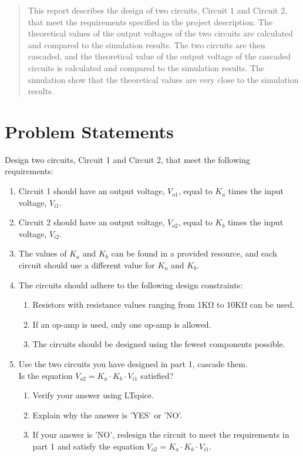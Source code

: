 \documentclass{zc-ust-hw}
\begin{document}
\maketitle
\tableofcontents
\listoffigures
\listoftables
\lstlistoflistings
\begin{abstract}
  This report describes the design of two circuits, Circuit 1 and Circuit 2,
  that meet the requirements specified in the project description. The
  theoretical values of the output voltages of the two circuits are calculated
  and compared to the simulation results. The two circuits are then cascaded,
  and the theoretical value of the output voltage of the cascaded circuits is
  calculated and compared to the simulation results. The simulation show that
  the theoretical values are very close to the simulation results.
\end{abstract}

\section{Problem Statements}
\label{sec:problem-statements}

Design two circuits, Circuit 1 and Circuit 2, that meet the following
requirements:

\begin{enumerate}
  \item Circuit 1 should have an output voltage, $V_{o1}$, equal to $K_a$ times
    the input voltage, $V_{i1}$.
  \item Circuit 2 should have an output voltage, $V_{o2}$, equal to $K_b$ times
    the input voltage, $V_{i2}$.
  \item The values of $K_a$ and $K_b$ can be found in a provided resource, and
    each circuit should use a different value for $K_a$ and $K_b$.
  \item The circuits should adhere to the following design constraints:
    \begin{enumerate}
      \item Resistors with resistance values ranging from 1KΩ to 10KΩ can be
        used.
      \item If an op-amp is used, only one op-amp is allowed.
      \item The circuits should be designed using the fewest components
        possible.
    \end{enumerate}
  \item Use the two circuits you have designed in part 1, cascade them.\\Is the
    equation $V_{o2} = K_a \cdot K_b \cdot V_{i1}$ satisfied?
    \begin{enumerate}
      \item Verify your answer using LTspice.
      \item Explain why the answer is 'YES' or 'NO'.
      \item If your answer is 'NO', redesign the circuit to meet the
        requirements in part 1 and satisfy the equation $V_{o2} = K_a \cdot K_b
        \cdot V_{i1}$.
    \end{enumerate}
\end{enumerate}
\end{document}
